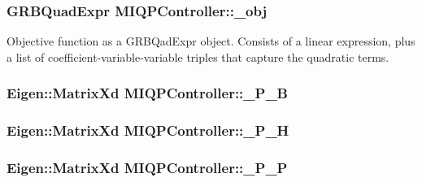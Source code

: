 \hypertarget{classMIQPController_a4bac1e68bd433553a7c00677bdc496dd}{
\subsubsection[{\-\_\-obj}]{\setlength{\rightskip}{0pt plus 5cm}\-G\-R\-B\-Quad\-Expr {\bf \-M\-I\-Q\-P\-Controller\-::\-\_\-obj}}}\label{classMIQPController_a4bac1e68bd433553a7c00677bdc496dd}
\-Objective function as a \-G\-R\-B\-Qad\-Expr object. \-Consists of a linear expression, plus a list of coefficient-\/variable-\/variable triples that capture the quadratic terms. \hypertarget{classMIQPController_a848852d659dff4a566a8dca57819587d}{
\subsubsection[{\-\_\-\-P\-\_\-\-B}]{\setlength{\rightskip}{0pt plus 5cm}\-Eigen\-::\-Matrix\-Xd {\bf \-M\-I\-Q\-P\-Controller\-::\-\_\-\-P\-\_\-\-B}}}\label{classMIQPController_a848852d659dff4a566a8dca57819587d}
\hypertarget{classMIQPController_afb83c4fddc4adba989506ccc9b62ff1e}{
\subsubsection[{\-\_\-\-P\-\_\-\-H}]{\setlength{\rightskip}{0pt plus 5cm}\-Eigen\-::\-Matrix\-Xd {\bf \-M\-I\-Q\-P\-Controller\-::\-\_\-\-P\-\_\-\-H}}}\label{classMIQPController_afb83c4fddc4adba989506ccc9b62ff1e}
\hypertarget{classMIQPController_a8243f4111abb4ad6c331ac147a844118}{
\subsubsection[{\-\_\-\-P\-\_\-\-P}]{\setlength{\rightskip}{0pt plus 5cm}\-Eigen\-::\-Matrix\-Xd {\bf \-M\-I\-Q\-P\-Controller\-::\-\_\-\-P\-\_\-\-P}}}\label{classMIQPController_a8243f4111abb4ad6c331ac147a844118}
